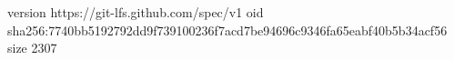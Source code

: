 version https://git-lfs.github.com/spec/v1
oid sha256:7740bb5192792dd9f739100236f7acd7be94696c9346fa65eabf40b5b34acf56
size 2307
